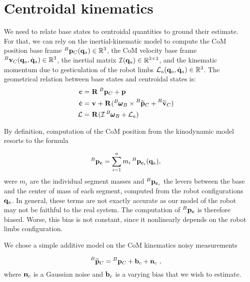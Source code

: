 \section{Centroidal kinematics}
\label{sec:centroidal_kinematics}
%
We need to relate base states to centroidal quantities to ground their estimate. 
For that, we can rely on the inertial-kinematic model to compute the CoM position \wrt base frame $\prescript{B}{}{{\bf p}}_{C}({\bf q}_a) \in \mathbb{R}^3$, the CoM velocity \wrt 
base frame $\prescript{B}{}{{\bf v}}_{C}({\bf q}_a, \dot{{\bf q}}_a) \in \mathbb{R}^3$, the inertial matrix $\mathcal{I}({\bf q}_a) \in \mathbb{R}^{3\times 3}$, and the kinematic momentum due to gesticulation 
of the robot limbs $\mathcal{L}_a({\bf q}_a, \dot{{\bf q}}_a) \in \mathbb{R}^{3}$. The geometrical relation between base states and centroidal states is:
%
\begin{equation}
    \begin{split}
    {\bf c} &= \prescript{}{}{{\bf R}}_{} \prescript{B}{}{{\bf p}}_{C} + \prescript{}{}{{\bf p}}_{}
    \\
    \dot{{\bf c}} &= 
    \prescript{}{}{{\bf v}}_{} + \prescript{}{}{{\bf R}}_{}(\prescript{B}{}{\pmb{\omega}}_{B} \times \prescript{B}{}{\widetilde{{\bf p}}}_{C} + \prescript{B}{}{\widetilde{{\bf v}}}_{C})
    \\
    \mathcal{L} &= \prescript{}{}{{\bf R}}_{}(\mathcal{I} \prescript{B}{}{\pmb{\omega}}_{B}+ \mathcal{L}_a)
    \end{split}
\end{equation}

By definition, computation of the CoM position from the kinodynamic model resorts to the formula

\begin{equation}
    \prescript{B}{}{{\bf p}}_{{\bf c}} = \sum_{i=1}^{n} m_i \prescript{B}{}{{\bf p}}_{{\bf c}_i}({\bf q}_a),
\end{equation}
%
were $m_i$ are the individual segment masses and $\prescript{B}{}{{\bf p}}_{{\bf c}_i}$ the levers between the base and the center of mass of each segment, computed from the robot configurations ${\bf q}_a$. 
In general, these terms are not exactly accurate as our model of the robot may not be faithful to the real system. The computation of $\prescript{B}{}{{\bf p}}_{{\bf c}}$ is therefore biased. 
Worse, this bias is not constant, since it nonlinearly depends on the robot limbs configuration. 

We chose a simple additive model on the CoM kinematics noisy measurements

\begin{equation}
    \prescript{B}{}{\widetilde{{\bf p}}}_{C} = \prescript{B}{}{{\bf p}}_{C} + {\bf b}_{c} + {\bf n}_c~,
    \label{eq:com_kine_meas}
\end{equation}
%
where ${\bf n}_c$ is a Gaussian noise and ${\bf b}_{c}$ is a varying bias that we wish to estimate.


